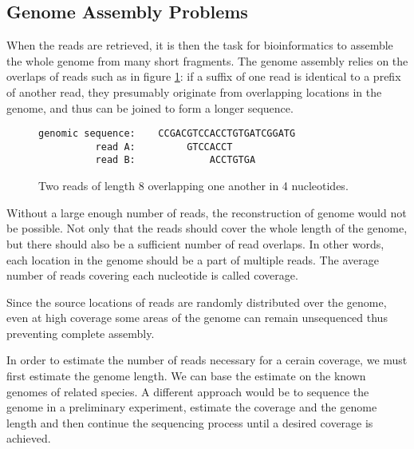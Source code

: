 \subsection{Genome Assembly Problems}

When the reads are retrieved, it is then the task for bioinformatics to assemble the whole genome from many short fragments.
The genome assembly relies on the overlaps of reads such as in figure \ref{fig:overlapping-reads}:
if a suffix of one read is identical to a prefix of another read, they presumably originate from overlapping
locations in the genome, and thus can be joined to form a longer sequence.

\begin{figure}[h]
\centering
\begin{varwidth}{\linewidth}
\begin{verbatim}
genomic sequence:    CCGACGTCCACCTGTGATCGGATG
          read A:         GTCCACCT
          read B:             ACCTGTGA
\end{verbatim}
\end{varwidth}
\caption[Two overlapping reads]{Two reads of length 8 overlapping one another in 4 nucleotides.}
\label{fig:overlapping-reads}
\end{figure}

Without a large enough number of reads, the reconstruction of genome would not be possible.
Not only that the reads should cover the whole length of the genome, but there should also be a sufficient number of read overlaps.
In other words, each location in the genome should be a part of multiple reads. The average number of reads covering each nucleotide
is called coverage. %

Since the source locations of reads are randomly distributed over the genome, even at high coverage
some areas of the genome can remain unsequenced thus preventing complete assembly.

In order to estimate the number of reads necessary for a cerain coverage, we must first estimate the genome length. 
We can base the estimate on the known genomes of related species. A different approach would be to sequence
the genome in a preliminary experiment, estimate the coverage and the genome length and then continue the
sequencing process until a desired coverage is achieved.

\medskip

